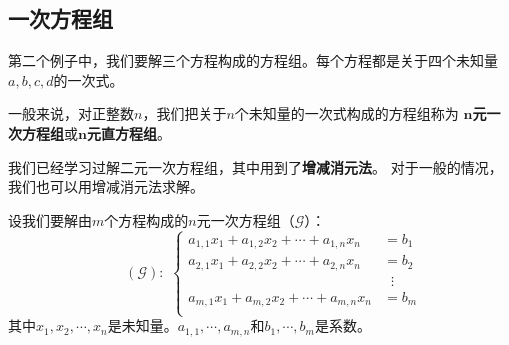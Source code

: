 \documentclass[12pt,UTF8]{ctexbook}
\theoremstyle{definition}
\theoremstyle{plain}
\begin{document}

\subsection{一次方程组}

第二个例子中，我们要解三个方程构成的方程组。每个方程都是关于四个未知量$a,b,c,d$的一次式。

一般来说，对正整数$n$，我们把关于$n$个未知量的一次式构成的方程组称为
$\boldsymbol{n}$\textbf{元一次方程组}或$\boldsymbol{n}$\textbf{元直方程组}。

我们已经学习过解二元一次方程组，其中用到了\textbf{增减消元法}。
对于一般的情况，我们也可以用增减消元法求解。

设我们要解由$m$个方程构成的$n$元一次方程组（$\mathcal{G}$）：
$$
\qquad (\mathcal{G}):\,\,
\left\{
    \begin{aligned}
        a_{1,1} x_1 + a_{1,2} x_2 + \cdots + a_{1,n} x_n &= b_1 \\
        a_{2,1} x_1 + a_{2,2} x_2 + \cdots + a_{2,n} x_n &= b_2 \\
        &\;\;\vdots \\
        a_{m,1} x_1 + a_{m,2} x_2 + \cdots + a_{m,n} x_n &= b_m \\
    \end{aligned}
\right.
$$
其中$x_1, x_2, \cdots , x_n$是未知量。$a_{1,1}, \cdots , a_{m,n}$和$b_1, \cdots , b_m$是系数。
\end{document}
